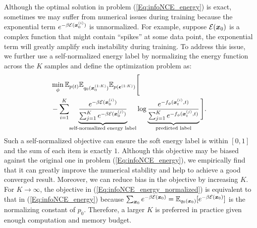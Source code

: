 Although the optimal solution in problem (\ref{Eq:infoNCE_energy}) is exact, sometimes we may suffer from numerical issues during training because the exponential term $e^{-\beta{\mathcal{E}}({\bm{x}}_0^{(i)})}$ is unnormalized. For example, suppose ${\mathcal{E}}({\bm{x}}_0)$ is a complex function that might contain ``spikes'' at some data point, the exponential term will greatly amplify such instability during training. To address this issue, we further use a self-normalized energy label by normalizing the energy function across the $K$ samples and define the optimization problem as:
\begin{equation}
\label{Eq:infoNCE_energy_normalized}
\begin{split}
    &\min_\phi \mathbb{E}_{p(t)}\mathbb{E}_{q_0({\bm{x}}_0^{(1:K)})}\mathbb{E}_{p(\bm{\epsilon}^{(1:K)})}\Bigg[ \\
    &- \sum_{i=1}^K \!
    \underbrace{\frac{e^{-\beta{\mathcal{E}}({\bm{x}}_0^{(i)})}}{\sum_{j=1}^K e^{-\beta{\mathcal{E}}({\bm{x}}_0^{(j)})}}}_{\text{self-normalized energy label}}
    \log \underbrace{\frac{e^{-f_\phi({\bm{x}}_t^{(i)},t)}}{\sum_{j=1}^K e^{-f_\phi({\bm{x}}_t^{(j)},t)}}}_{\text{predicted label}}
\Bigg].
\end{split}
\end{equation}
Such a self-normalized objective can ensure the soft energy label is within $[0,1]$ and the sum of each item is exactly $1$. Although this objective may be biased against the original one in problem (\ref{Eq:infoNCE_energy}), we empirically find that it can greatly improve the numerical stability and help to achieve a good converged result. Moreover, we can reduce bias in the objective by increasing $K$. For $K\rightarrow \infty$, the objective in (\ref{Eq:infoNCE_energy_normalized}) is equivalent to that in (\ref{Eq:infoNCE_energy}) because $\sum_{{\bm{x}}_0}  e^{-\beta{\mathcal{E}}({\bm{x}}_0)} = \mathbb{E}_{q_0({\bm{x}}_0)}[e^{-\beta{\mathcal{E}}({\bm{x}}_0)}]$ is the normalizing constant of $p_0$. Therefore, a larger $K$ is preferred in practice given enough computation and memory budget.










